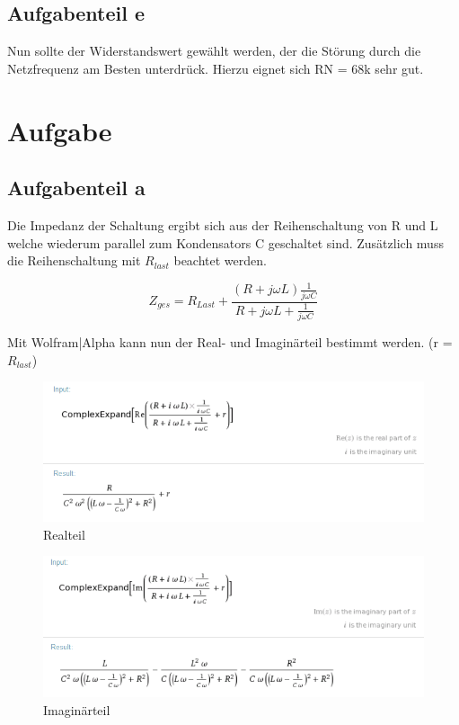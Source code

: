 \documentclass[%
  a4paper, %
  12pt, %
   article, %
  titlepage
]{scrartcl}
\begin{document}
\subsection{Aufgabenteil e}

Nun sollte der Widerstandswert gewählt werden, der die Störung durch die Netzfrequenz am Besten unterdrück. 
Hierzu eignet sich RN = 68k sehr gut.

\clearpage

\section{Aufgabe}
\subsection{Aufgabenteil a}

Die Impedanz der Schaltung ergibt sich aus der Reihenschaltung von R und L welche wiederum parallel zum Kondensators
C geschaltet sind. Zusätzlich muss die Reihenschaltung mit $R_{last}$ beachtet werden.

\begin{equation}
Z_{ges}=R_{Last}+\frac{(R+j\omega L)\frac{1}{j\omega C}}{R+j\omega L+\frac{1}{j\omega C}}
\end{equation}

Mit Wolfram|Alpha  kann nun der Real- und Imaginärteil bestimmt werden. (r = $R_{last}$)

\begin{figure}[h]
\includegraphics[width=\textwidth]{wolfram1.png}
\caption{Realteil}
\label{fig3}
\end{figure}

\begin{figure}[h]
\includegraphics[width=\textwidth]{wolfram2.png}
\caption{Imaginärteil}
\label{fig3}
\end{figure}

\clearpage
\end{document}
